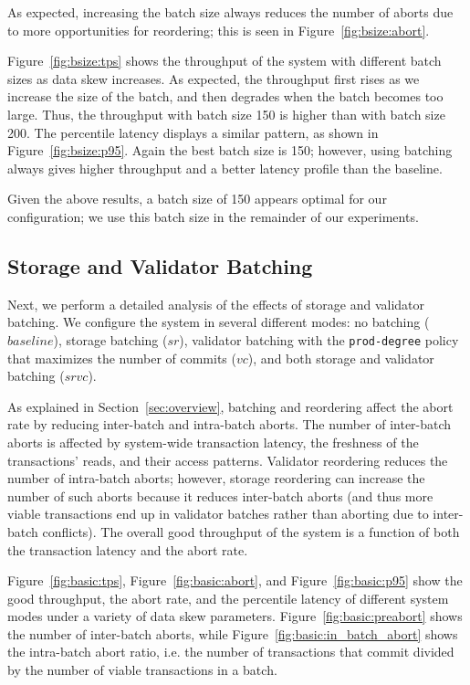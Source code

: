 As expected, increasing the batch size always reduces the number of aborts due to more opportunities for reordering; this is seen in Figure~\ref{fig:bsize:abort}. 

Figure~\ref{fig:bsize:tps} shows the throughput of the system with different batch sizes as data skew increases. As expected, the throughput first rises as we increase the size of the batch, and then degrades when the batch becomes too large. Thus, the throughput with batch size 150 is higher than with batch size 200. The percentile latency displays a similar pattern, as shown in Figure~\ref{fig:bsize:p95}. Again the best batch size is 150; however, using batching always gives higher throughput and a better latency profile than the baseline.



Given the above results, a batch size of 150 appears optimal for our configuration; we use this batch size in the remainder of our experiments. 

\subsection{Storage and Validator Batching}

Next, we perform a detailed analysis of the effects of storage and validator batching. We configure the system in several different modes: no batching ($baseline$), storage batching ($sr$), validator batching with the \texttt{prod-degree} policy that maximizes the number of commits ($vc$), and both storage and validator batching ($srvc$).


As explained in Section~\ref{sec:overview}, batching and reordering affect the abort rate by reducing inter-batch and intra-batch aborts. The number of inter-batch aborts is affected by system-wide transaction latency, the freshness of the transactions' reads, and their access patterns. Validator reordering reduces the number of intra-batch aborts; however, storage reordering can increase the number of such aborts because it reduces inter-batch aborts (and thus more viable transactions end up in validator batches rather than aborting due to inter-batch conflicts). The overall good throughput of the system is a function of both the transaction latency and the abort rate. 


Figure~\ref{fig:basic:tps}, Figure~\ref{fig:basic:abort}, and Figure~\ref{fig:basic:p95} show the good throughput, the abort rate, and the percentile latency of different system modes under a variety of data skew parameters. Figure~\ref{fig:basic:preabort} shows the number of inter-batch aborts, while Figure~\ref{fig:basic:in_batch_abort} shows the intra-batch abort ratio, i.e. the number of transactions that commit divided by the number of viable transactions in a batch.



